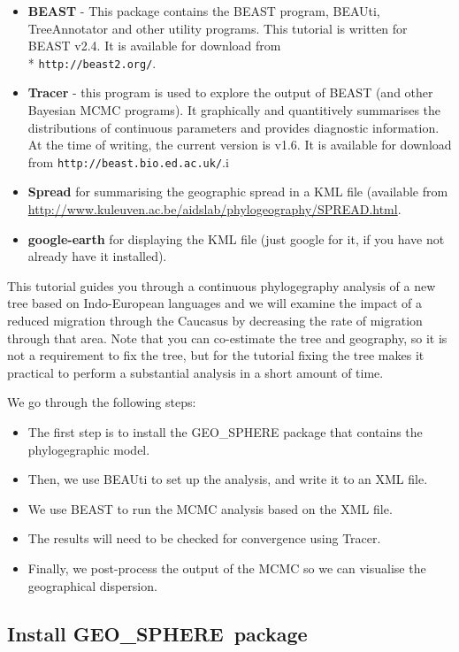 \documentclass{article}
\newcommand{\BEASTVersion}{2.4}
\newcommand{\TracerVersion}{1.6}
\def\beast-geo{GEO\_SPHERE}
\begin{document}
\begin{itemize}

\item {\bf BEAST} - This package contains the BEAST program, BEAUti, TreeAnnotator and other utility programs. This tutorial is written for BEAST v{\BEASTVersion}. It is available for download from \\* \texttt{http://beast2.org/}.
\item {\bf Tracer} - this program is used to explore the output of BEAST (and other Bayesian MCMC programs). It graphically and
quantitively summarises the distributions of continuous parameters and provides diagnostic information. At the time of
writing, the current version is v{\TracerVersion}. It is available for download from \texttt{http://beast.bio.ed.ac.uk/}.i
\item {\bf Spread} for summarising the geographic spread in a KML file (available from \url{http://www.kuleuven.ac.be/aidslab/phylogeography/SPREAD.html}.
\item {\bf google-earth} for displaying the KML file (just google for it, if you have not already have it installed).
\end{itemize}


This tutorial guides you through a continuous phylogegraphy analysis of a new tree based on Indo-European languages and we will examine the impact of a reduced migration through the Caucasus by decreasing the rate of migration through that area. Note that you can co-estimate the tree and geography, so it is not a requirement to fix the tree, but for the tutorial fixing the tree makes it practical to perform a substantial analysis in a short amount of time.

We go through the following steps:
\begin{itemize}
\item The first step is to install the \beast-geo{} package that contains the phylogegraphic model. 
\item Then, we use BEAUti to set up the analysis, and write it to an XML file.
\item We use BEAST to run the MCMC analysis based on the XML file.
\item The results will need to be checked for convergence using Tracer.
\item Finally, we post-process the output of the MCMC so we can visualise the geographical dispersion.
\end{itemize}

\subsection*{Install \beast-geo\ package}
\end{document}
